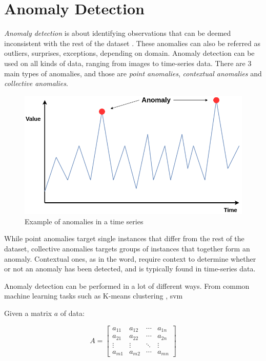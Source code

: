 \section{Anomaly Detection}
\label{back:anomdet}

\textit{Anomaly detection} is about identifying observations that can be deemed inconsistent with the rest of the dataset \cite{anomaly}. These anomalies can also be referred as outliers, surprises, exceptions, depending on domain. Anomaly detection can be used on all kinds of data, ranging from images to time-series data. There are 3 main types of anomalies, and those are \textit{point anomalies}, \textit{contextual anomalies} and \textit{collective anomalies}.

\begin{figure}[!h]
    \centering
    \includegraphics[scale=0.4]{figures/anolay_line.png}
    \caption{Example of anomalies in a time series}
    \label{fig:anomaly_example}
\end{figure}

While point anomalies target single instances that differ from the rest of the dataset, collective anomalies targets groups of instances that together form an anomaly. Contextual ones, as in the word, require context to determine whether or not an anomaly has been detected, and is typically found in time-series data.

Anomaly detection can be performed in a lot of different ways. From common machine learning tasks such as K-means clustering \cite{7507933}, \Gls{svm} \cite{10.1007/978-3-540-28647-9_97}





Given a matrix $a$ of data:

\[
A = \begin{bmatrix}
a_{11} & a_{12} & \cdots & a_{1n} \\
a_{21} & a_{22} & \cdots & a_{2n} \\
\vdots & \vdots & \ddots & \vdots \\
a_{m1} & a_{m2} & \cdots & a_{mn}
\end{bmatrix}
\]

